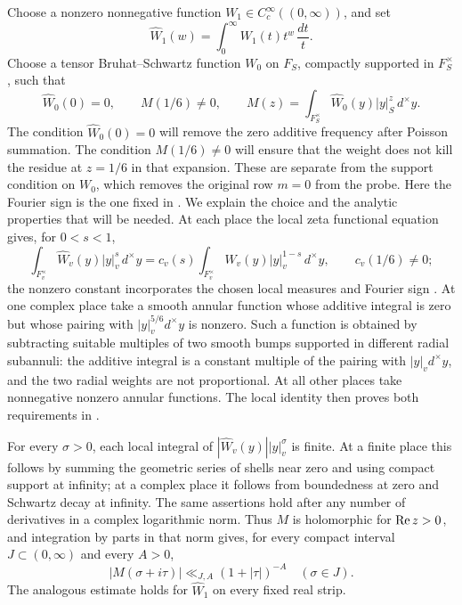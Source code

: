 Choose a nonzero nonnegative function \(W_1\in C_c^\infty((0,\infty))\),
and set
\[
 \widehat W_1(w)=\int_0^\infty W_1(t)t^w\,\frac{dt}{t}.
\]
Choose a tensor Bruhat--Schwartz function \(W_0\) on \(F_S\), compactly
supported in \(F_S^\times\), such that
\begin{equation}
 \widehat W_0(0)=0,\qquad
 M(1/6)\ne0,\qquad
 M(z)=\int_{F_S^\times}\widehat W_0(y)|y|_S^z\,d^\times y .
\label{eq:poisson-Fourier-weight}
\end{equation}
The condition \(\widehat W_0(0)=0\) will remove the zero additive
frequency after Poisson summation.  The condition \(M(1/6)\ne0\) will
ensure that the weight does not kill the residue at \(z=1/6\) in that
expansion.  These are separate from the support condition on \(W_0\),
which removes the original row \(m=0\) from the probe.
Here the Fourier sign is the one fixed in .  We
explain the choice and the analytic properties that will be needed.  At
each place the local zeta functional equation gives, for \(0<s<1\),
\[
 \int_{F_v^\times}\widehat W_v(y)|y|_v^s\,d^\times y
   =c_v(s)\int_{F_v^\times}W_v(y)|y|_v^{1-s}\,d^\times y,
 \qquad c_v(1/6)\ne0;
\]
the nonzero constant incorporates the chosen local measures and Fourier
sign \cite[Theorem~2.4.1]{Tate67}.  At one complex place take a smooth annular function
whose additive integral is zero but whose pairing with
\(|y|_v^{5/6}d^\times y\) is nonzero.  Such a function is obtained by
subtracting suitable multiples of two smooth bumps supported in different
radial subannuli: the additive integral is a constant multiple of the
pairing with \(|y|_v d^\times y\), and the two radial weights are not
proportional.  At all other places take nonnegative nonzero annular
functions.  The local identity then proves both requirements in
.

For every \(\sigma>0\), each local integral of
\(|\widehat W_v(y)||y|_v^\sigma\) is finite.  At a finite place this follows
by summing the geometric series of shells near zero and using compact
support at infinity; at a complex place it follows from boundedness at
zero and Schwartz decay at infinity.  The same assertions hold after any
number of derivatives in a complex logarithmic norm.  Thus \(M\) is
holomorphic for \(\operatorname{Re} z>0\), and integration by parts in that norm gives,
for every compact interval \(J\subset(0,\infty)\) and every \(A>0\),
\begin{equation}
 |M(\sigma+i\tau)|\ll_{J,A}(1+|\tau|)^{-A}
 \quad(\sigma\in J).
\label{eq:poisson-M-decay}
\end{equation}
The analogous estimate holds for \(\widehat W_1\) on every fixed real
strip.

